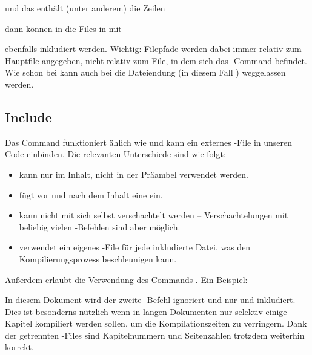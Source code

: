 und das  enthält (unter anderem) die Zeilen
\begin{latexlisting}
	
	
\end{latexlisting}
dann können in  die Files in  mit
\begin{latexlisting}
	
	
\end{latexlisting}
ebenfalls inkludiert werden.
Wichtig: Filepfade werden dabei immer relativ zum Hauptfile  angegeben, nicht relativ zum File, in dem sich das -Command befindet.
Wie schon bei  kann auch bei  die Dateiendung (in diesem Fall ) weggelassen werden.

\subsection{Include}
Das Command  funktioniert ählich wie  und kann ein externes -File in unseren Code einbinden.
Die relevanten Unterschiede sind wie folgt:
\begin{itemize}
	\item {} kann nur im Inhalt, nicht in der Präambel verwendet werden.
	\item {} fügt vor und nach dem Inhalt eine  ein.
	\item {} kann nicht mit sich selbst verschachtelt werden -- Verschachtelungen mit beliebig vielen -Befehlen sind aber möglich.
	\item {} verwendet ein eigenes -File für jede inkludierte Datei, was den Kompilierungsprozess beschleunigen kann.
\end{itemize}
Außerdem erlaubt  die Verwendung des Commands .
Ein Beispiel:
In diesem Dokument wird der zweite -Befehl ignoriert und nur  und  inkludiert.
Dies ist besonderns nützlich wenn in langen Dokumenten nur selektiv einige Kapitel kompiliert werden sollen, um die Kompilationszeiten zu verringern.
Dank der getrennten -Files sind Kapitelnummern und Seitenzahlen trotzdem weiterhin korrekt.

